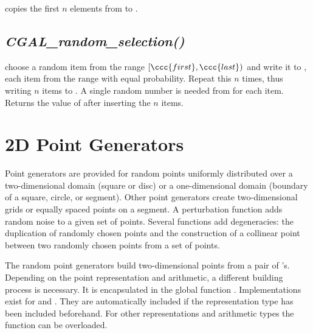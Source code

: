 {copies the first $n$ elements from  to .}

\subsection{{\it CGAL\_random\_selection()}}
\label{sectionRandomSelection}

{ choose a random item from the range $[\ccc{first},\ccc{last})$ and
    write it to , each item from the range with equal
    probability. Repeat this $n$ times, thus writing $n$ items to
    .
    A single random number is needed from  for each item.
    Returns the value of  after inserting the $n$ items.
}



\newpage
\section{2D Point Generators}

\ccDefinition

Point generators are provided for random points uniformly distributed
over a two-dimensional domain (square or disc) or a one-dimensional
domain (boundary of a square, circle, or segment). Other point
generators create two-dimensional grids or equally spaced points on a
segment. A perturbation function adds random noise to a given set of
points. Several functions add degeneracies: the duplication of randomly
chosen points and the construction of a collinear point between two randomly
chosen points from a set of points.



\ccCreation

The random point generators build two-dimensional points from a pair
of 's. Depending on the point representation and
arithmetic, a different building process is necessary. It is
encapsulated in the global function .
Implementations exist for  and
. They are automatically included if the
representation type  has been included beforehand.
For other representations and arithmetic types the function can be
overloaded.

